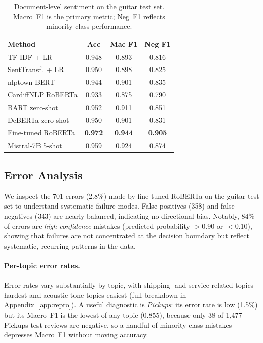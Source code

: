 \documentclass[11pt]{article}
\begin{document}
\begin{table}[t]
\centering
\small
\setlength{\tabcolsep}{4pt}
\caption{Document-level sentiment on the guitar test set.
Macro~F1 is the primary metric; Neg~F1 reflects minority-class
performance.}
\label{tab:sentiment}
\begin{tabular}{lccc}
\toprule
\textbf{Method} & \textbf{Acc} & \textbf{Mac F1} & \textbf{Neg F1} \\
\midrule
TF-IDF + LR            & 0.948 & 0.893 & 0.816 \\
SentTransf.\ + LR      & 0.950 & 0.898 & 0.825 \\
nlptown BERT           & 0.944 & 0.901 & 0.835 \\
CardiffNLP RoBERTa     & 0.933 & 0.875 & 0.790 \\
BART zero-shot         & 0.952 & 0.911 & 0.851 \\
DeBERTa zero-shot      & 0.950 & 0.901 & 0.831 \\
Fine-tuned RoBERTa     & \textbf{0.972} & \textbf{0.944} & \textbf{0.905} \\
Mistral-7B 5-shot      & 0.959 & 0.924 & 0.874 \\
\bottomrule
\end{tabular}
\end{table}

\subsection{Error Analysis}
\label{sec:error}

We inspect the 701 errors (2.8\%) made by fine-tuned RoBERTa on the
guitar test set to understand systematic failure modes.
False positives (358) and false negatives (343) are nearly balanced,
indicating no directional bias.
Notably, 84\% of errors are \textit{high-confidence} mistakes
(predicted probability $>$0.90 or $<$0.10), showing that failures
are not concentrated at the decision boundary but reflect
systematic, recurring patterns in the data.

\paragraph{Per-topic error rates.}
Error rates vary substantially by topic, with shipping- and
service-related topics hardest and acoustic-tone topics easiest
(full breakdown in Appendix~\ref{app:repro}).
A useful diagnostic is \textit{Pickups}: its error rate is low
(1.5\%) but its Macro~F1 is the lowest of any topic (0.855),
because only 38 of 1{,}477 Pickups test reviews are negative, so a
handful of minority-class mistakes depresses Macro~F1 without
moving accuracy.
\end{document}
